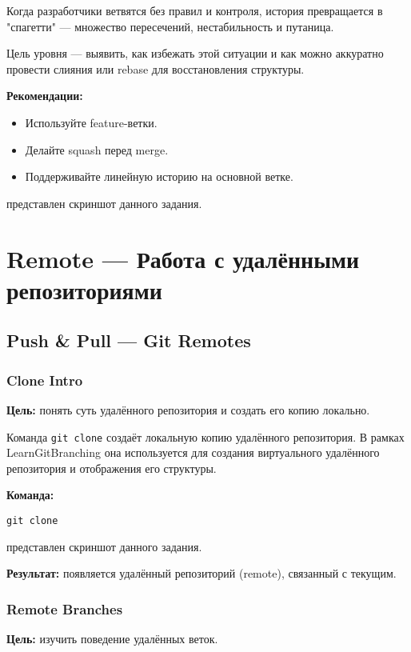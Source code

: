 \documentclass[a4paper,12pt]{report}
\begin{document}
Когда разработчики ветвятся без правил и контроля, история превращается в "спагетти" — множество пересечений, нестабильность и путаница.

Цель уровня — выявить, как избежать этой ситуации и как можно аккуратно провести слияния или rebase для восстановления структуры.

\textbf{Рекомендации:}
\begin{itemize}[noitemsep]
  \item Используйте feature-ветки.
  \item Делайте squash перед merge.
  \item Поддерживайте линейную историю на основной ветке.
\end{itemize}

 представлен скриншот данного задания.

\section{Remote — Работа с удалёнными репозиториями}

\subsection{Push \& Pull — Git Remotes}

\subsubsection{Clone Intro}
\textbf{Цель:} понять суть удалённого репозитория и создать его копию локально.

Команда \texttt{git clone} создаёт локальную копию удалённого репозитория. В рамках LearnGitBranching она используется для создания виртуального удалённого репозитория и отображения его структуры.

\textbf{Команда:}
\begin{verbatim}
git clone
\end{verbatim}

 представлен скриншот данного задания.

\textbf{Результат:} появляется удалённый репозиторий (remote), связанный с текущим.

\subsubsection{Remote Branches}
\textbf{Цель:} изучить поведение удалённых веток.
\end{document}
